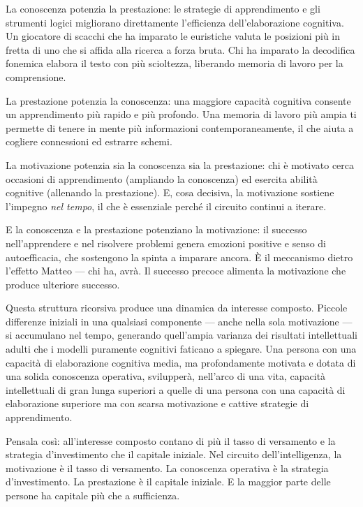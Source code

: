 \documentclass[11pt, twoside, openright]{book}
\begin{document}
La conoscenza potenzia la prestazione: le strategie di apprendimento e gli strumenti logici migliorano direttamente l'efficienza dell'elaborazione cognitiva. Un giocatore di scacchi che ha imparato le euristiche valuta le posizioni più in fretta di uno che si affida alla ricerca a forza bruta. Chi ha imparato la decodifica fonemica elabora il testo con più scioltezza, liberando memoria di lavoro per la comprensione.

La prestazione potenzia la conoscenza: una maggiore capacità cognitiva consente un apprendimento più rapido e più profondo. Una memoria di lavoro più ampia ti permette di tenere in mente più informazioni contemporaneamente, il che aiuta a cogliere connessioni ed estrarre schemi.

La motivazione potenzia sia la conoscenza sia la prestazione: chi è motivato cerca occasioni di apprendimento (ampliando la conoscenza) ed esercita abilità cognitive (allenando la prestazione). E, cosa decisiva, la motivazione sostiene l'impegno \textit{nel tempo}, il che è essenziale perché il circuito continui a iterare.

E la conoscenza e la prestazione potenziano la motivazione: il successo nell'apprendere e nel risolvere problemi genera emozioni positive e senso di autoefficacia, che sostengono la spinta a imparare ancora. È il meccanismo dietro l'effetto Matteo --- chi ha, avrà. Il successo precoce alimenta la motivazione che produce ulteriore successo.

Questa struttura ricorsiva produce una dinamica da interesse composto. Piccole differenze iniziali in una qualsiasi componente --- anche nella sola motivazione --- si accumulano nel tempo, generando quell'ampia varianza dei risultati intellettuali adulti che i modelli puramente cognitivi faticano a spiegare. Una persona con una capacità di elaborazione cognitiva media, ma profondamente motivata e dotata di una solida conoscenza operativa, svilupperà, nell'arco di una vita, capacità intellettuali di gran lunga superiori a quelle di una persona con una capacità di elaborazione superiore ma con scarsa motivazione e cattive strategie di apprendimento.

Pensala così: all'interesse composto contano di più il tasso di versamento e la strategia d'investimento che il capitale iniziale. Nel circuito dell'intelligenza, la motivazione è il tasso di versamento. La conoscenza operativa è la strategia d'investimento. La prestazione è il capitale iniziale. E la maggior parte delle persone ha capitale più che a sufficienza.
\end{document}
